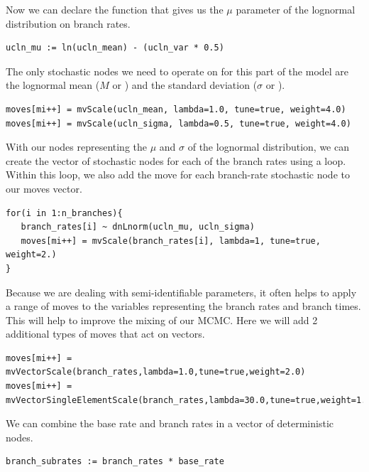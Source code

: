 Now we can declare the function that gives us the $\mu$ parameter of the lognormal distribution on branch rates.
{\tt \begin{snugshade*}
\begin{lstlisting}
ucln_mu := ln(ucln_mean) - (ucln_var * 0.5)
\end{lstlisting}
\end{snugshade*}}

The only stochastic nodes we need to operate on for this part of the model are the lognormal mean ($M$ or ) and the standard deviation ($\sigma$ or ).
{\tt \begin{snugshade*}
\begin{lstlisting}
moves[mi++] = mvScale(ucln_mean, lambda=1.0, tune=true, weight=4.0)
moves[mi++] = mvScale(ucln_sigma, lambda=0.5, tune=true, weight=4.0)
\end{lstlisting}
\end{snugshade*}}

With our nodes representing the $\mu$ and $\sigma$ of the lognormal distribution, we can create the vector of stochastic nodes for each of the branch rates using a  loop. 
Within this loop, we also add the move for each branch-rate stochastic node to our moves vector.
{\tt \begin{snugshade*}
\begin{lstlisting}
for(i in 1:n_branches){
   branch_rates[i] ~ dnLnorm(ucln_mu, ucln_sigma)
   moves[mi++] = mvScale(branch_rates[i], lambda=1, tune=true, weight=2.)
}
\end{lstlisting}
\end{snugshade*}}

Because we are dealing with semi-identifiable parameters, it often helps to apply a range of moves to the variables representing the branch rates and branch times. This will help to improve the mixing of our MCMC.
Here we will add 2 additional types of moves that act on vectors.
{\tt \begin{snugshade*}
\begin{lstlisting}
moves[mi++] = mvVectorScale(branch_rates,lambda=1.0,tune=true,weight=2.0) 
moves[mi++] = mvVectorSingleElementScale(branch_rates,lambda=30.0,tune=true,weight=1.0) 
\end{lstlisting}
\end{snugshade*}}

We can combine the base rate and branch rates in a vector of deterministic nodes.
{\tt \begin{snugshade*}
\begin{lstlisting}
branch_subrates := branch_rates * base_rate
\end{lstlisting}
\end{snugshade*}}

